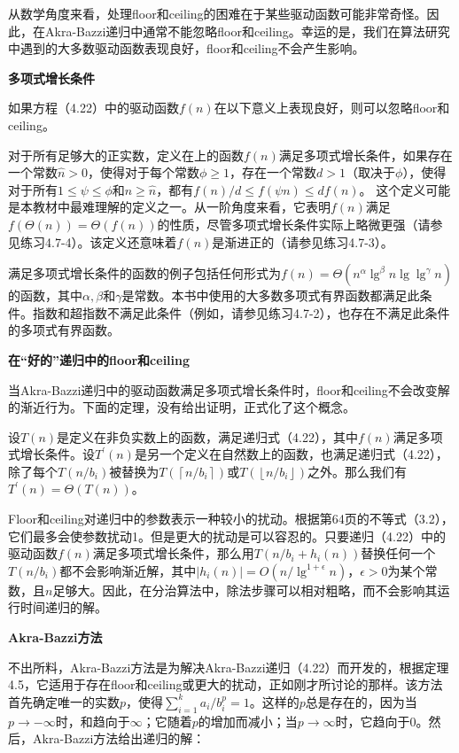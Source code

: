 \documentclass[lang=cn,newtx,10pt,scheme=chinese]{elegantbook}
\begin{document}
从数学角度来看，处理floor和ceiling的困难在于某些驱动函数可能非常奇怪。因此，在Akra-Bazzi递归中通常不能忽略floor和ceiling。幸运的是，我们在算法研究中遇到的大多数驱动函数表现良好，floor和ceiling不会产生影响。

\textbf{多项式增长条件}

如果方程（4.22）中的驱动函数$f(n)$在以下意义上表现良好，则可以忽略floor和ceiling。

对于所有足够大的正实数，定义在上的函数$f(n)$满足多项式增长条件，如果存在一个常数$\hat{n}>0$，使得对于每个常数$\phi \geq 1$，存在一个常数$d>1$（取决于$\phi$），使得对于所有$1 \leq \psi \leq \phi$和$n \geq \hat{n}$，都有$f(n) / d \leq f(\psi n) \leq d f(n)$。
这个定义可能是本教材中最难理解的定义之一。从一阶角度来看，它表明$f(n)$满足$f(\Theta(n))=\Theta(f(n))$的性质，尽管多项式增长条件实际上略微更强（请参见练习4.7-4）。该定义还意味着$f(n)$是渐进正的（请参见练习4.7-3）。

满足多项式增长条件的函数的例子包括任何形式为$f(n)=\Theta\left(n^\alpha \lg ^\beta n \lg \lg ^\gamma n\right)$的函数，其中$\alpha, \beta$和$\gamma$是常数。本书中使用的大多数多项式有界函数都满足此条件。指数和超指数不满足此条件（例如，请参见练习4.7-2），也存在不满足此条件的多项式有界函数。

\textbf{在“好的”递归中的floor和ceiling}

当Akra-Bazzi递归中的驱动函数满足多项式增长条件时，floor和ceiling不会改变解的渐近行为。下面的定理，没有给出证明，正式化了这个概念。

\begin{theorem}{}{}
设$T(n)$是定义在非负实数上的函数，满足递归式（4.22），其中$f(n)$满足多项式增长条件。设$T^{\prime}(n)$是另一个定义在自然数上的函数，也满足递归式（4.22），除了每个$T\left(n / b_i\right)$被替换为$T\left(\left\lceil n / b_i\right\rceil\right)$或$T\left(\left\lfloor n / b_i\right\rfloor\right)$之外。那么我们有$T^{\prime}(n)=\Theta(T(n))$。
\end{theorem}

Floor和ceiling对递归中的参数表示一种较小的扰动。根据第64页的不等式（3.2），它们最多会使参数扰动1。但是更大的扰动是可以容忍的。只要递归（4.22）中的驱动函数$f(n)$满足多项式增长条件，那么用$T\left(n / b_i+h_i(n)\right)$替换任何一个$T\left(n / b_i\right)$都不会影响渐近解，其中$\left|h_i(n)\right|=O\left(n / \lg ^{1+\epsilon} n\right)$，$\epsilon>0$为某个常数，且$n$足够大。因此，在分治算法中，除法步骤可以相对粗略，而不会影响其运行时间递归的解。

\textbf{Akra-Bazzi方法}

不出所料，Akra-Bazzi方法是为解决Akra-Bazzi递归（4.22）而开发的，根据定理4.5，它适用于存在floor和ceiling或更大的扰动，正如刚才所讨论的那样。该方法首先确定唯一的实数$p$，使得$\sum_{i=1}^k a_i / b_i^p=1$。这样的$p$总是存在的，因为当$p \rightarrow-\infty$时，和趋向于$\infty$；它随着$p$的增加而减小；当$p \rightarrow \infty$时，它趋向于0。然后，Akra-Bazzi方法给出递归的解：
\end{document}
